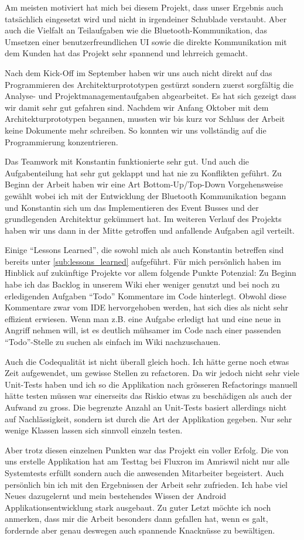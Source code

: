 Am meisten motiviert hat mich bei diesem Projekt, dass unser Ergebnis auch tatsächlich eingesetzt wird und nicht in irgendeiner Schublade verstaubt. Aber auch die Vielfalt an Teilaufgaben wie die Bluetooth-Kommunikation, das Umsetzen einer benutzerfreundlichen UI sowie die direkte Kommunikation mit dem Kunden  hat das Projekt sehr spannend und lehrreich gemacht. 

Nach dem Kick-Off im September haben wir uns auch nicht direkt auf das Programmieren des Architekturprototypen gestürzt sondern zuerst sorgfältig die Analyse- und Projektmanagementaufgaben abgearbeitet. Es hat sich gezeigt dass wir damit sehr gut gefahren sind. Nachdem wir Anfang Oktober mit dem Architekturprototypen begannen, mussten wir bis kurz vor Schluss der Arbeit keine Dokumente mehr schreiben. So konnten wir uns vollständig auf die Programmierung konzentrieren. 

Das Teamwork mit Konstantin funktionierte sehr gut. Und auch die Aufgabenteilung hat sehr gut geklappt und hat nie zu Konflikten geführt. Zu Beginn der Arbeit haben wir eine Art Bottom-Up/Top-Down Vorgehensweise gewählt wobei ich mit der Entwicklung der Bluetooth Kommunikation begann und Konstantin sich um das Implementieren des Event Busses und der grundlegenden Architektur gekümmert hat. Im weiteren Verlauf des Projekts haben wir uns dann in der Mitte getroffen und anfallende Aufgaben agil verteilt.

Einige \enquote{Lessons Learned}, die sowohl mich als auch Konstantin betreffen sind bereits unter \ref{sub:lessons_learned} aufgeführt. Für mich persönlich haben im Hinblick auf zukünftige Projekte vor allem folgende Punkte Potenzial: Zu Beginn habe ich das Backlog in unserem Wiki eher weniger genutzt und bei noch zu erledigenden Aufgaben \enquote{Todo} Kommentare im Code hinterlegt. Obwohl diese Kommentare zwar vom \ac{IDE} hervorgehoben werden, hat sich dies als nicht sehr effizient erwiesen. Wenn man z.B. eine Aufgabe erledigt hat und eine neue in Angriff nehmen will, ist es deutlich mühsamer im Code nach einer passenden \enquote{Todo}-Stelle zu suchen als einfach im Wiki nachzuschauen.

Auch die Codequalität ist nicht überall gleich hoch. Ich hätte gerne noch etwas Zeit aufgewendet, um gewisse Stellen zu refactoren. Da wir jedoch nicht sehr viele Unit-Tests haben und ich so die Applikation nach grösseren Refactorings manuell hätte testen müssen war einerseits das Riskio etwas zu beschädigen als auch der Aufwand zu gross. Die begrenzte Anzahl an Unit-Tests basiert allerdings nicht auf Nachlässigkeit, sondern ist durch die Art der Applikation gegeben. Nur sehr wenige Klassen lassen sich sinnvoll einzeln testen. 

Aber trotz diesen einzelnen Punkten war das Projekt ein voller Erfolg. Die von uns erstelle Applikation hat am Testtag bei Fluxron im Amriswil nicht nur alle Systemtests erfüllt sondern auch die anwesenden Mitarbeiter begeistert. Auch persönlich bin ich mit den Ergebnissen der Arbeit sehr zufrieden. Ich habe viel Neues dazugelernt und mein bestehendes Wissen der Android Applikationsentwicklung stark ausgebaut. Zu guter Letzt möchte ich noch anmerken, dass mir die Arbeit besonders dann gefallen hat, wenn es galt, fordernde aber genau deswegen auch spannende Knacknüsse zu bewältigen.